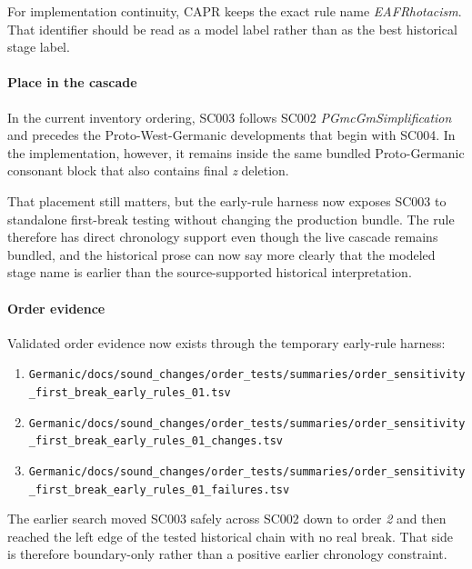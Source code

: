 \documentclass[
  british,
  a4paper,
]{article}
\providecommand{\tightlist}{%
  \setlength{\itemsep}{0pt}\setlength{\parskip}{0pt}}
\begin{document}
For implementation continuity, CAPR keeps the exact rule name
\emph{EAFRhotacism}. That identifier should be read as a model label
rather than as the best historical stage label.

\paragraph{Place in the cascade}\label{place-in-the-cascade}

In the current inventory ordering, SC003 follows SC002
\emph{PGmcGmSimplification} and precedes the Proto-West-Germanic
developments that begin with SC004. In the implementation, however, it
remains inside the same bundled Proto-Germanic consonant block that also
contains final \emph{z} deletion.

That placement still matters, but the early-rule harness now exposes
SC003 to standalone first-break testing without changing the production
bundle. The rule therefore has direct chronology support even though the
live cascade remains bundled, and the historical prose can now say more
clearly that the modeled stage name is earlier than the source-supported
historical interpretation.

\paragraph{Order evidence}\label{order-evidence}

Validated order evidence now exists through the temporary early-rule
harness:

\begin{enumerate}
\def\labelenumi{\arabic{enumi}.}
\tightlist
\item
  \texttt{Germanic/docs/sound\_changes/order\_tests/summaries/order\_sensitivity\_first\_break\_early\_rules\_01.tsv}
\item
  \texttt{Germanic/docs/sound\_changes/order\_tests/summaries/order\_sensitivity\_first\_break\_early\_rules\_01\_changes.tsv}
\item
  \texttt{Germanic/docs/sound\_changes/order\_tests/summaries/order\_sensitivity\_first\_break\_early\_rules\_01\_failures.tsv}
\end{enumerate}

The earlier search moved SC003 safely across SC002 down to order
\emph{2} and then reached the left edge of the tested historical chain
with no real break. That side is therefore boundary-only rather than a
positive earlier chronology constraint.
\end{document}
